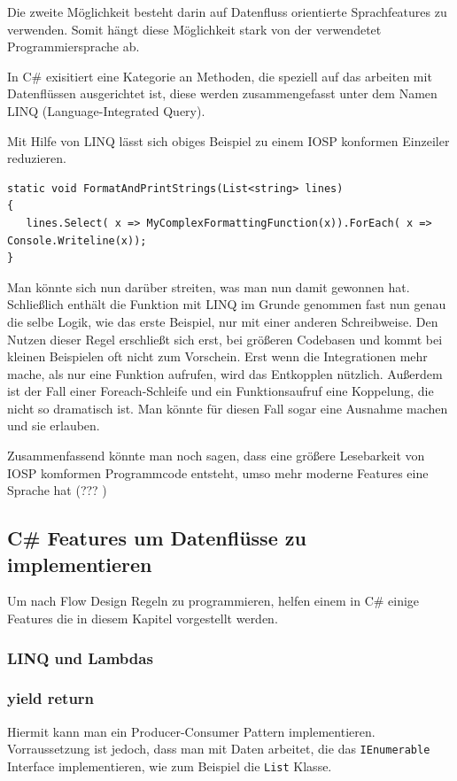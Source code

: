 \documentclass[11pt]{article}
\begin{document}
Die zweite Möglichkeit besteht darin auf Datenfluss orientierte Sprachfeatures zu verwenden.
Somit hängt diese Möglichkeit stark von der verwendetet Programmiersprache ab.

In C\# exisitiert eine Kategorie an Methoden, die speziell auf das arbeiten mit Datenflüssen ausgerichtet ist, diese werden 
zusammengefasst unter dem Namen LINQ (Language-Integrated Query).

Mit Hilfe von LINQ lässt sich obiges Beispiel zu einem IOSP konformen Einzeiler reduzieren.

\begin{verbatim}
static void FormatAndPrintStrings(List<string> lines)
{
   lines.Select( x => MyComplexFormattingFunction(x)).ForEach( x => Console.Writeline(x));
}
\end{verbatim}
Man könnte sich nun darüber streiten, was man nun damit gewonnen hat. Schließlich enthält die Funktion mit LINQ im Grunde
genommen fast nun genau die selbe Logik, wie das erste Beispiel, nur mit einer anderen Schreibweise.
Den Nutzen dieser Regel erschließt sich erst, bei größeren Codebasen und kommt bei kleinen Beispielen oft nicht zum Vorschein.
Erst wenn die Integrationen mehr mache, als nur eine Funktion aufrufen, wird das Entkopplen nützlich.
Außerdem ist der Fall einer Foreach-Schleife und ein Funktionsaufruf eine Koppelung, die nicht so dramatisch ist. Man
könnte für diesen Fall sogar eine Ausnahme machen und sie erlauben.


Zusammenfassend könnte man noch sagen, dass eine größere Lesebarkeit von IOSP komformen Programmcode entsteht, umso mehr moderne
Features eine Sprache hat (??? )
\subsection{C\# Features um Datenflüsse zu implementieren}
\label{sec:orgheadline29}
Um nach Flow Design Regeln zu programmieren, helfen einem in C\# einige Features die in diesem Kapitel vorgestellt werden.

\subsubsection{LINQ und Lambdas}
\label{sec:orgheadline27}
\subsubsection{yield return}
\label{sec:orgheadline28}
Hiermit kann man ein Producer-Consumer Pattern implementieren.
Vorraussetzung ist jedoch, dass man mit Daten arbeitet, die das \texttt{IEnumerable} Interface implementieren, wie zum Beispiel die
\texttt{List} Klasse.
\end{document}
